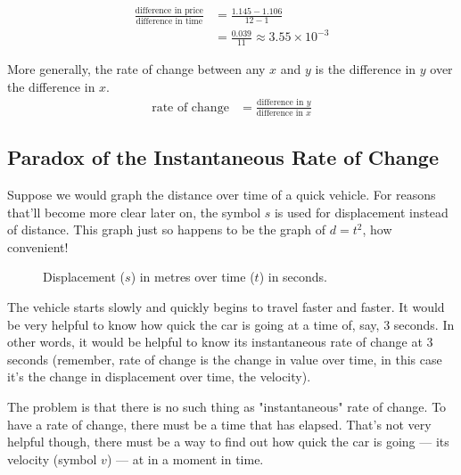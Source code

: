 \begin{align*}
	\frac{\text{difference in price}}{\text{difference in time}} &=\frac{1.145-1.106}{12-1}\\[0.75em]
	&=\frac{0.039}{11} \approx 3.55\times10^{-3}
\end{align*}

More generally, the rate of change between any $x$ and $y$ is the difference in $y$ over the difference in $x$.
\begin{align*}
\text{rate of change} &= \frac{\text{difference in $y$}}{\text{difference in $x$}}
\end{align*}

\subsection{Paradox of the Instantaneous Rate of Change}
Suppose we would graph the distance over time of a quick vehicle. For reasons that'll become more clear later on, the symbol $s$ is used for displacement instead of distance. This graph just so happens to be the graph of $d=t^2$, how convenient!

\begin{figure}[h!]
	\centering
	\caption{Displacement ($s$) in metres over time ($t$) in seconds.}
	\label{POIexample}
\end{figure}

The vehicle starts slowly and quickly begins to travel faster and faster. It would be very helpful to know how quick the car is going at a time of, say, 3 seconds. In other words, it would be helpful to know its instantaneous rate of change at 3 seconds (remember, rate of change is the change in value over time, in this case it's the change in displacement over time, the velocity).

The problem is that there is no such thing as "instantaneous" rate of change. To have a rate of change, there must be a time that has elapsed. That's not very helpful though, there must be a way to find out how quick the car is going --- its velocity (symbol $v$) --- at in a moment in time.

